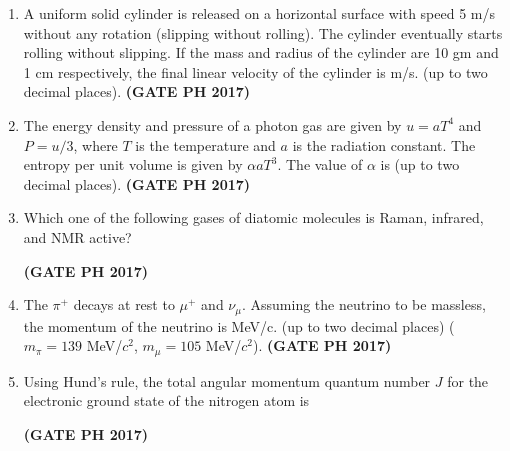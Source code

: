 \documentclass[14pt, a4paper]{extarticle}
\begin{document}
\begin{enumerate}[label=\textbf{Q.\arabic*}]
\item A uniform solid cylinder is released on a horizontal surface with speed 5 m/s without any rotation (slipping without rolling). The cylinder eventually starts rolling without slipping. If the mass and radius of the cylinder are 10 gm and 1 cm respectively, the final linear velocity of the cylinder is \underline{\hspace{3cm}} m/s. (up to two decimal places).
\hfill \textbf{(GATE PH 2017)}

\item The energy density and pressure of a photon gas are given by $u=aT^4$ and $P=u/3$, where $T$ is the temperature and $a$ is the radiation constant. The entropy per unit volume is given by $\alpha a T^3$. The value of $\alpha$ is \underline{\hspace{3cm}} (up to two decimal places).
\hfill \textbf{(GATE PH 2017)}

\item Which one of the following gases of diatomic molecules is Raman, infrared, and NMR active?
\begin{enumerate}
\end{enumerate}
\hfill \textbf{(GATE PH 2017)}

\item The $\pi^+$ decays at rest to $\mu^+$ and $\nu_{\mu}$. Assuming the neutrino to be massless, the momentum of the neutrino is \underline{\hspace{3cm}} MeV/c. (up to two decimal places) ($m_{\pi} = 139$ MeV/$c^2$, $m_{\mu} = 105$ MeV/$c^2$).
\hfill \textbf{(GATE PH 2017)}

\item Using Hund's rule, the total angular momentum quantum number $J$ for the electronic ground state of the nitrogen atom is
\begin{enumerate}
\end{enumerate}
\hfill \textbf{(GATE PH 2017)}


\end{enumerate}
\end{document}

